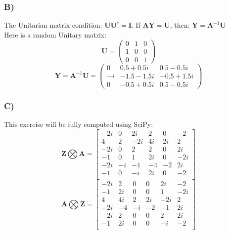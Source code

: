 \documentclass{article}
\begin{document}
            \subsubsection*{B)}
                The Unitarian matrix condition: $\mathbf{UU^{\dagger}} = \mathbf{I}$. If $\mathbf{AY} = \mathbf{U}$, then: $\mathbf{Y} = \mathbf{A}^{-1}\mathbf{U}$ \\
                Here is a random Unitary matrix:
                \[
                    \mathbf{U} = \begin{pmatrix}
                        0 & 1 & 0 \\
                        1 & 0 & 0 \\
                        0 & 0 & 1
                    \end{pmatrix}
                \]
                \[
                    \mathbf{Y} = \mathbf{A}^{-1}\mathbf{U} = 
                    \begin{pmatrix}
                    0 & 0.5 + 0.5i & 0.5 - 0.5i \\
                    -i & -1.5 - 1.5i & -0.5 + 1.5i \\
                    0 & -0.5 + 0.5i & 0.5 - 0.5i
                    \end{pmatrix}
                \]
            \subsubsection*{C)}
                This exercise will be fully computed using SciPy:
                \[
                    \mathbf{Z} \bigotimes \mathbf{A} = 
                    \begin{bmatrix}
                    -2i & 0 & 2i & 2 & 0 & -2 \\
                    4 & 2 & -2i & 4i & 2i & 2 \\
                    -2i & 0 & 2 & 2 & 0 & 2i \\
                    -1 & 0 & 1 & 2i & 0 & -2i \\
                    -2i & -i & -1 & -4 & -2 & 2i \\
                    -1 & 0 & -i & 2i & 0 & -2 \\
                    \end{bmatrix}
                \]
                \[
                    \mathbf{A} \bigotimes \mathbf{Z} = 
                    \begin{bmatrix}
                    -2i & 2 & 0 & 0 & 2i & -2 \\
                    -1 & 2i & 0 & 0 & 1 & -2i \\
                    4 & 4i & 2 & 2i & -2i & 2 \\
                    -2i & -4 & -i & -2 & -1 & 2i \\
                    -2i & 2 & 0 & 0 & 2 & 2i \\
                    -1 & 2i & 0 & 0 & -i & -2 \\
                    \end{bmatrix}
                \]
    \newpage
\end{document}
